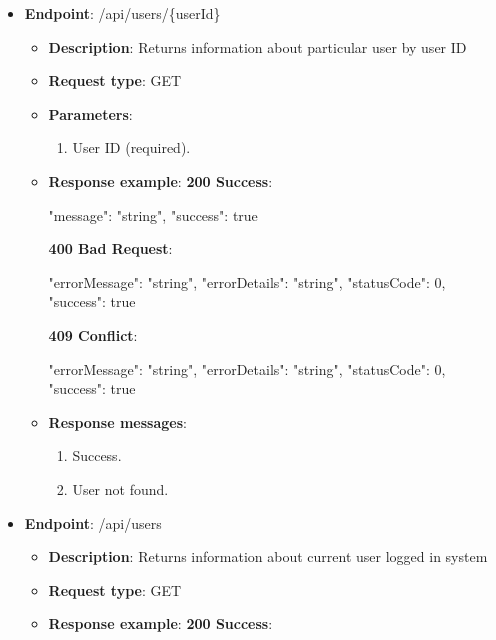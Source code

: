 \begin{itemize}
    \item \textbf{Endpoint}: /api/users/\{userId\}
    \begin{itemize}
        \item \textbf{Description}: Returns information about particular user by user ID
        \item \textbf{Request type}: GET
        \item \textbf{Parameters}:
        \begin{enumerate}
            \item User ID (required).
        \end{enumerate}
        \item \textbf{Response example}:
        \textbf{200 Success}:
        \begin{spverbatim}
        {
            "message": "string",
            "success": true
        }
        \end{spverbatim}
        \textbf{400 Bad Request}:
        \begin{spverbatim}
        {
            "errorMessage": "string",
            "errorDetails": "string",
            "statusCode": 0,
            "success": true
        }
        \end{spverbatim}
        \textbf{409 Conflict}:
        \begin{spverbatim}
        {
            "errorMessage": "string",
            "errorDetails": "string",
            "statusCode": 0,
            "success": true
        }
        \end{spverbatim}
        \item \textbf{Response messages}:
        \begin{enumerate}
            \item Success.
            \item User not found.
        \end{enumerate}
    \end{itemize}
    \item \textbf{Endpoint}: /api/users
    \begin{itemize}
        \item \textbf{Description}: Returns information about current user logged in system
        \item \textbf{Request type}: GET
        \item \textbf{Response example}:
        \textbf{200 Success}:

\end{itemize}
\end{itemize}
